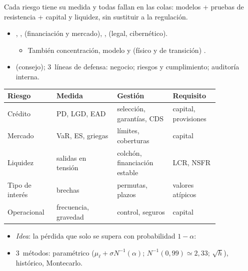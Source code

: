 \documentclass{article}
\begin{document}
\begin{columnas}
\begin{ideaclave}
Cada riesgo tiene su medida y todas fallan en las colas: modelos + pruebas de resistencia + capital y liquidez, sin sustituir a la regulación.
\end{ideaclave}
\begin{itemize}
\item {}, ,  (financiación y mercado), ,  (legal, cibernético).
  \begin{itemize}
  \item También concentración, modelo y  (físico y de transición) .
  \end{itemize}
\item {} (consejo); 3~líneas de defensa: negocio; riesgos y cumplimiento; auditoría interna.
\end{itemize}
{\small\noindent\begin{tabular}{@{}>{\raggedright\arraybackslash}p{0.17\linewidth}|>{\raggedright\arraybackslash}p{0.25\linewidth}|>{\raggedright\arraybackslash}p{0.23\linewidth}|>{\raggedright\arraybackslash}p{0.19\linewidth}@{}}
\textbf{Riesgo} & \textbf{Medida} & \textbf{Gestión} & \textbf{Requisito}\\ \hline
Crédito & PD, LGD, EAD & selección, garantías, CDS & capital, provisiones\\
Mercado & VaR, ES, griegas & límites, coberturas & capital\\
Liquidez & salidas en tensión & colchón, financiación estable & LCR, NSFR\\
Tipo de interés & brechas & permutas, plazos & valores atípicos\\
Operacional & frecuencia, gravedad & control, seguros & capital\\
\end{tabular}\par}
\begin{itemize}
\item \emph{Idea}: la pérdida que solo se supera con probabilidad $1-\alpha$:
\item 3~métodos: paramétrico ($\mu_\ell+\sigma N^{-1}(\alpha)$; $N^{-1}(0{,}99)\simeq2{,}33$; $\sqrt h$), histórico, Montecarlo.

\end{itemize}
\end{columnas}
\end{document}
